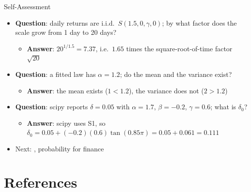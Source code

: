\begin{frame}{Self-Assessment}
\itemsize{\small}
\begin{itemize}
    \item \textbf{Question}: daily returns are i.i.d.\ $S(1.5, 0, \gamma, 0)$; by what factor does the scale grow from 1 day to 20 days?
    \begin{itemize}
        \item \textbf{Answer}: $20^{1/1.5} = 7.37$, i.e.\ $1.65$ times the square-root-of-time factor $\sqrt{20}$
    \end{itemize}
    \item \textbf{Question}: a fitted law has $\alpha = 1.2$; do the mean and the variance exist?
    \begin{itemize}
        \item \textbf{Answer}: the mean exists ($1 < 1.2$), the variance does not ($2 > 1.2$)
    \end{itemize}
    \item \textbf{Question}: scipy reports $\delta = 0.05$ with $\alpha = 1.7$, $\beta = -0.2$, $\gamma = 0.6$; what is $\delta_0$?
    \begin{itemize}
        \item \textbf{Answer}: scipy uses S1, so $\delta_0 = 0.05 + (-0.2)(0.6)\tan(0.85\pi) = 0.05 + 0.061 = 0.111$
    \end{itemize}
    \item Next: , probability for finance
\end{itemize}
\end{frame}


\section{References}

